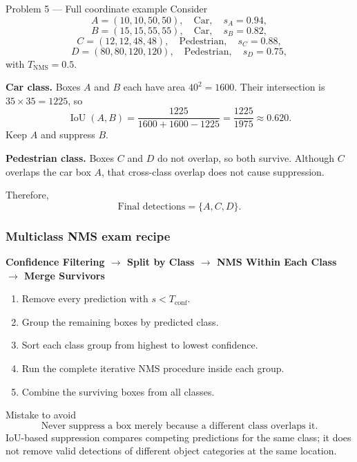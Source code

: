 \documentclass[11pt]{article}
\begin{document}
\begin{practicebox}{Problem 5 --- Full coordinate example}
Consider
\[
A=(10,10,50,50),\quad \text{Car},\quad s_A=0.94,
\]
\[
B=(15,15,55,55),\quad \text{Car},\quad s_B=0.82,
\]
\[
C=(12,12,48,48),\quad \text{Pedestrian},\quad s_C=0.88,
\]
\[
D=(80,80,120,120),\quad \text{Pedestrian},\quad s_D=0.75,
\]
with \(T_{\mathrm{NMS}}=0.5\).

\textbf{Car class.} Boxes \(A\) and \(B\) each have area \(40^2=1600\). Their intersection is \(35\times35=1225\), so
\[
\operatorname{IoU}(A,B)
=\frac{1225}{1600+1600-1225}
=\frac{1225}{1975}
\approx0.620.
\]
Keep \(A\) and suppress \(B\).

\textbf{Pedestrian class.} Boxes \(C\) and \(D\) do not overlap, so both survive. Although \(C\) overlaps the car box \(A\), that cross-class overlap does not cause suppression.

Therefore,
\[
\boxed{\text{Final detections}=\{A,C,D\}}.
\]
\end{practicebox}

\subsubsection{Multiclass NMS exam recipe}

\begin{focusbox}
\begin{center}
\large\bfseries\color{PlanNavy}
Confidence Filtering
\(\boldsymbol{\longrightarrow}\)
Split by Class
\(\boldsymbol{\longrightarrow}\)
NMS Within Each Class
\(\boldsymbol{\longrightarrow}\)
Merge Survivors
\end{center}
\end{focusbox}

\begin{enumerate}[label=\textbf{\arabic*.},leftmargin=*,align=left,nosep]
  \item Remove every prediction with \(s<T_{\mathrm{conf}}\).
  \item Group the remaining boxes by predicted class.
  \item Sort each class group from highest to lowest confidence.
  \item Run the complete iterative NMS procedure inside each group.
  \item Combine the surviving boxes from all classes.
\end{enumerate}

\begin{prioritybox}{Mistake to avoid}
\[
\boxed{
\text{Never suppress a box merely because a different class overlaps it.}
}
\]
IoU-based suppression compares competing predictions for the same class; it does not remove valid detections of different object categories at the same location.
\end{prioritybox}
\end{document}

